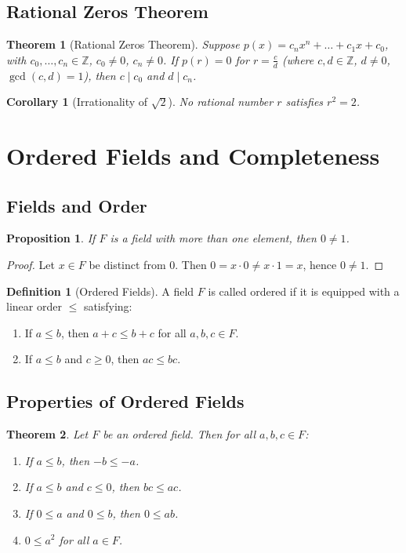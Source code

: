\documentclass[9pt]{article}
\theoremstyle{definition}
\newtheorem{definition}{Definition}
\theoremstyle{plain}
\newtheorem{theorem}{Theorem}
\newtheorem{proposition}{Proposition}
\newtheorem{corollary}{Corollary}
\begin{document}
\subsection*{Rational Zeros Theorem}
\begin{theorem}[Rational Zeros Theorem]
Suppose \( p(x) = c_nx^n + \ldots + c_1x + c_0 \), with \( c_0, \ldots, c_n \in \mathbb{Z} \), \( c_0 \neq 0 \), \( c_n \neq 0 \). If \( p(r) = 0 \) for \( r = \frac{c}{d} \) (where \( c, d \in \mathbb{Z} \), \( d \neq 0 \), \( \gcd(c, d) = 1 \)), then \( c \mid c_0 \) and \( d \mid c_n \).
\end{theorem}

\begin{corollary}[Irrationality of \( \sqrt{2} \)]
No rational number \( r \) satisfies \( r^2 = 2 \).
\end{corollary}
\section*{Ordered Fields and Completeness}

\subsection*{Fields and Order}
\begin{proposition}
If \( F \) is a field with more than one element, then \( 0 \neq 1 \).
\end{proposition}
\begin{proof}
Let \( x \in F \) be distinct from \( 0 \). Then \( 0 = x \cdot 0 \neq x \cdot 1 = x \), hence \( 0 \neq 1 \).
\end{proof}

\begin{definition}[Ordered Fields]
A field \( F \) is called ordered if it is equipped with a linear order \( \leq \) satisfying:
\begin{enumerate}[label=(O\arabic*)]
    \item If \( a \leq b \), then \( a + c \leq b + c \) for all \( a, b, c \in F \).
    \item If \( a \leq b \) and \( c \geq 0 \), then \( ac \leq bc \).
\end{enumerate}
\end{definition}

\subsection*{Properties of Ordered Fields}
\begin{theorem}
Let \( F \) be an ordered field. Then for all \( a, b, c \in F \):
\begin{enumerate}[label=(\roman*)]
    \item If \( a \leq b \), then \( -b \leq -a \).
    \item If \( a \leq b \) and \( c \leq 0 \), then \( bc \leq ac \).
    \item If \( 0 \leq a \) and \( 0 \leq b \), then \( 0 \leq ab \).
    \item \( 0 \leq a^2 \) for all \( a \in F \).
\end{enumerate}
\end{theorem}
\end{document}
